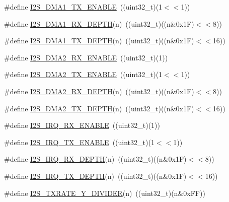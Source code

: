 \begin{DoxyCompactItemize}
\#define \hyperlink{group___i2_s___private___macros_ga0fb809d583bb8b68d34f347d19933575}{\-I2\-S\-\_\-\-D\-M\-A1\-\_\-\-T\-X\-\_\-\-E\-N\-A\-B\-L\-E}~((uint32\-\_\-t)(1$<$$<$1))
\item 
\#define \hyperlink{group___i2_s___private___macros_gaee0ebb1d1bc7444e2201d4473c41f182}{\-I2\-S\-\_\-\-D\-M\-A1\-\_\-\-R\-X\-\_\-\-D\-E\-P\-T\-H}(n)~((uint32\-\_\-t)((n\&0x1\-F)$<$$<$8))
\item 
\#define \hyperlink{group___i2_s___private___macros_ga4eedce5a4fc3c03413a4d7cfdd0f60de}{\-I2\-S\-\_\-\-D\-M\-A1\-\_\-\-T\-X\-\_\-\-D\-E\-P\-T\-H}(n)~((uint32\-\_\-t)((n\&0x1\-F)$<$$<$16))
\item 
\#define \hyperlink{group___i2_s___private___macros_ga2e4e8b4d132b01bb74d57dd34ca7eaef}{\-I2\-S\-\_\-\-D\-M\-A2\-\_\-\-R\-X\-\_\-\-E\-N\-A\-B\-L\-E}~((uint32\-\_\-t)(1))
\item 
\#define \hyperlink{group___i2_s___private___macros_ga2ceda1798034a70380c9a9de567bb6b0}{\-I2\-S\-\_\-\-D\-M\-A2\-\_\-\-T\-X\-\_\-\-E\-N\-A\-B\-L\-E}~((uint32\-\_\-t)(1$<$$<$1))
\item 
\#define \hyperlink{group___i2_s___private___macros_gaa988d9e73e80df6ce687e148ee9530ae}{\-I2\-S\-\_\-\-D\-M\-A2\-\_\-\-R\-X\-\_\-\-D\-E\-P\-T\-H}(n)~((uint32\-\_\-t)((n\&0x1\-F)$<$$<$8))
\item 
\#define \hyperlink{group___i2_s___private___macros_gaff02275ceaf3866c99b464b11ed0a270}{\-I2\-S\-\_\-\-D\-M\-A2\-\_\-\-T\-X\-\_\-\-D\-E\-P\-T\-H}(n)~((uint32\-\_\-t)((n\&0x1\-F)$<$$<$16))
\item 
\#define \hyperlink{group___i2_s___private___macros_ga362154dbf216f1384f535c940d930cd9}{\-I2\-S\-\_\-\-I\-R\-Q\-\_\-\-R\-X\-\_\-\-E\-N\-A\-B\-L\-E}~((uint32\-\_\-t)(1))
\item 
\#define \hyperlink{group___i2_s___private___macros_ga7811db5a292d68de3dce209883bab6c0}{\-I2\-S\-\_\-\-I\-R\-Q\-\_\-\-T\-X\-\_\-\-E\-N\-A\-B\-L\-E}~((uint32\-\_\-t)(1$<$$<$1))
\item 
\#define \hyperlink{group___i2_s___private___macros_ga8719ea9f2ad9a505b0d563387e8deb48}{\-I2\-S\-\_\-\-I\-R\-Q\-\_\-\-R\-X\-\_\-\-D\-E\-P\-T\-H}(n)~((uint32\-\_\-t)((n\&0x1\-F)$<$$<$8))
\item 
\#define \hyperlink{group___i2_s___private___macros_ga115bec3e7413054e340baceb5a066fa7}{\-I2\-S\-\_\-\-I\-R\-Q\-\_\-\-T\-X\-\_\-\-D\-E\-P\-T\-H}(n)~((uint32\-\_\-t)((n\&0x1\-F)$<$$<$16))
\item 
\#define \hyperlink{group___i2_s___private___macros_ga310a84df35c22ce4bed1f3785145670c}{\-I2\-S\-\_\-\-T\-X\-R\-A\-T\-E\-\_\-\-Y\-\_\-\-D\-I\-V\-I\-D\-E\-R}(n)~((uint32\-\_\-t)(n\&0x\-F\-F))
$$
\end{DoxyCompactItemize}
